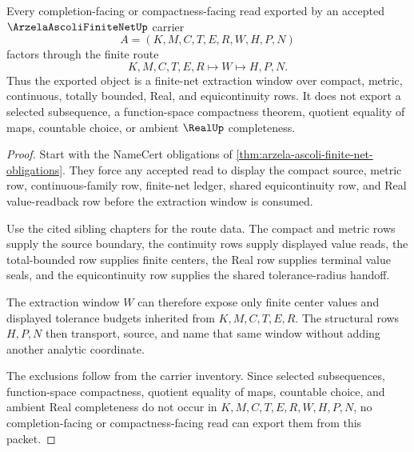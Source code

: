 \begin{theorem}
\label{thm:arzela-ascoli-finite-net-extraction}
Every completion-facing or compactness-facing read exported by an accepted $\ArzelaAscoliFiniteNetUp$ carrier
$$
A=(K,M,C,T,E,R,W,H,P,N)
$$
factors through the finite route
$$
K,M,C,T,E,R \longmapsto W \longmapsto H,P,N .
$$
Thus the exported object is a finite-net extraction window over compact, metric, continuous, totally bounded, Real, and equicontinuity rows. It does not export a selected subsequence, a function-space compactness theorem, quotient equality of maps, countable choice, or ambient $\RealUp$ completeness.
\end{theorem}
\begin{proof}
Start with the NameCert obligations of \autoref{thm:arzela-ascoli-finite-net-obligations}. They force any accepted read to display the compact source, metric row, continuous-family row, finite-net ledger, shared equicontinuity row, and Real value-readback row before the extraction window is consumed.

Use the cited sibling chapters for the route data. The compact and metric rows supply the source boundary, the continuity rows supply displayed value reads, the total-bounded row supplies finite centers, the Real row supplies terminal value seals, and the equicontinuity row supplies the shared tolerance-radius handoff.

The extraction window $W$ can therefore expose only finite center values and displayed tolerance budgets inherited from $K,M,C,T,E,R$. The structural rows $H,P,N$ then transport, source, and name that same window without adding another analytic coordinate.

The exclusions follow from the carrier inventory. Since selected subsequences, function-space compactness, quotient equality of maps, countable choice, and ambient Real completeness do not occur in $K,M,C,T,E,R,W,H,P,N$, no completion-facing or compactness-facing read can export them from this packet.
\end{proof}


